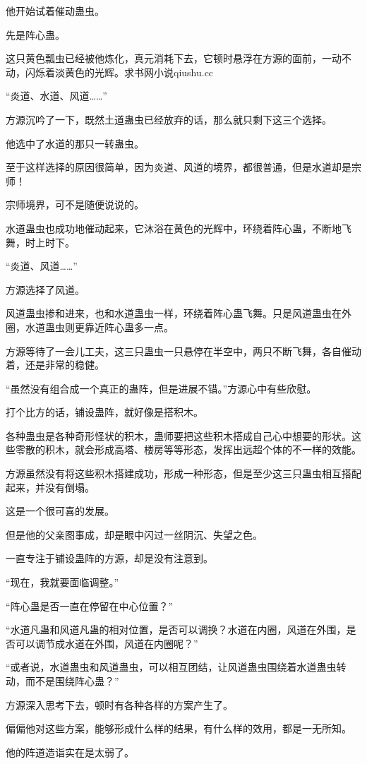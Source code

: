 \begin{this_body}
他开始试着催动蛊虫。

先是阵心蛊。

这只黄色瓢虫已经被他炼化，真元消耗下去，它顿时悬浮在方源的面前，一动不动，闪烁着淡黄色的光辉。求书网小说qiushu.cc

“炎道、水道、风道……”

方源沉吟了一下，既然土道蛊虫已经放弃的话，那么就只剩下这三个选择。

他选中了水道的那只一转蛊虫。

至于这样选择的原因很简单，因为炎道、风道的境界，都很普通，但是水道却是宗师！

宗师境界，可不是随便说说的。

水道蛊虫也成功地催动起来，它沐浴在黄色的光辉中，环绕着阵心蛊，不断地飞舞，时上时下。

“炎道、风道……”

方源选择了风道。

风道蛊虫掺和进来，也和水道蛊虫一样，环绕着阵心蛊飞舞。只是风道蛊虫在外圈，水道蛊虫则更靠近阵心蛊多一点。

方源等待了一会儿工夫，这三只蛊虫一只悬停在半空中，两只不断飞舞，各自催动着，还是非常的稳健。

“虽然没有组合成一个真正的蛊阵，但是进展不错。”方源心中有些欣慰。

打个比方的话，铺设蛊阵，就好像是搭积木。

各种蛊虫是各种奇形怪状的积木，蛊师要把这些积木搭成自己心中想要的形状。这些零散的积木，就会形成高塔、楼房等等形态，发挥出远超个体的不一样的效能。

方源虽然没有将这些积木搭建成功，形成一种形态，但是至少这三只蛊虫相互搭配起来，并没有倒塌。

这是一个很可喜的发展。

但是他的父亲图事成，却是眼中闪过一丝阴沉、失望之色。

一直专注于铺设蛊阵的方源，却是没有注意到。

“现在，我就要面临调整。”

“阵心蛊是否一直在停留在中心位置？”

“水道凡蛊和风道凡蛊的相对位置，是否可以调换？水道在内圈，风道在外围，是否可以调节成水道在外围，风道在内圈呢？”

“或者说，水道蛊虫和风道蛊虫，可以相互团结，让风道蛊虫围绕着水道蛊虫转动，而不是围绕阵心蛊？”

方源深入思考下去，顿时有各种各样的方案产生了。

偏偏他对这些方案，能够形成什么样的结果，有什么样的效用，都是一无所知。

他的阵道造诣实在是太弱了。


\end{this_body}
